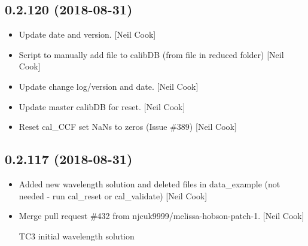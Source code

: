 \documentclass[a4paper,10pt,english]{report}
\begin{document}
\subsection{0.2.120 (2018-08-31)}
\label{\detokenize{misc/changelog:id341}}\begin{itemize}
\item {} 
Update date and version. {[}Neil Cook{]}

\item {} 
Script to manually add file to calibDB (from file in reduced folder)
{[}Neil Cook{]}

\item {} 
Update change log/version and date. {[}Neil Cook{]}

\item {} 
Update master calibDB for reset. {[}Neil Cook{]}

\item {} 
Reset cal\_CCF set NaNs to zeros (Issue \#389) {[}Neil Cook{]}

\end{itemize}


\subsection{0.2.117 (2018-08-31)}
\label{\detokenize{misc/changelog:id342}}\begin{itemize}
\item {} 
Added new wavelength solution and deleted files in data\_example (not
needed - run cal\_reset or cal\_validate) {[}Neil Cook{]}

\item {} 
Merge pull request \#432 from njcuk9999/melissa-hobson-patch-1. {[}Neil
Cook{]}

TC3 initial wavelength solution

\end{itemize}
\end{document}
